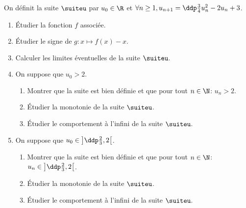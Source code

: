 
\begin{exercice} \;
On d\'efinit la suite $\suiteu$ par $u_0\in\R$ et $\forall n \geq 1, u_{n+1}=\ddp\frac{3}{4}u_n^2-2u_n+3$.
\begin{enumerate}
\item \'Etudier la fonction $f$ associ\'ee.
\item \'Etudier le signe de $g: x\mapsto f(x)-x$.
\item Calculer les limites \'eventuelles de la suite $\suiteu$.
\item On suppose que $u_0>2$.
\begin{enumerate}
\item Montrer que la suite est bien d\'efinie et que pour tout $n\in\N$: $u_n>2$.
\item \'Etudier la monotonie de la suite $\suiteu$.
\item \'Etudier le comportement \`{a} l'infini de la suite $\suiteu$.
\end{enumerate}
\item On suppose que $u_0\in\left\rbrack \ddp\frac{2}{3},2\right\lbrack $.
\begin{enumerate}
\item Montrer que la suite est bien d\'efinie et que pour tout $n\in\N$: $u_n\in\left\rbrack \ddp\frac{2}{3},2\right\lbrack$.
\item \'Etudier la monotonie de la suite $\suiteu$.
\item \'Etudier le comportement \`{a} l'infini de la suite $\suiteu$.
\end{enumerate} 
\end{enumerate}
\end{exercice}